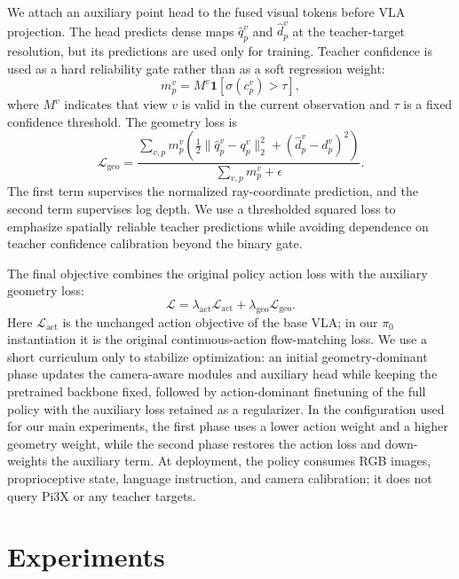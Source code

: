 \documentclass{article}
\begin{document}
We attach an auxiliary point head to the fused visual tokens before VLA projection. The head predicts dense maps $\hat{q}_p^v$ and $\hat{d}_p^v$ at the teacher-target resolution, but its predictions are used only for training. Teacher confidence is used as a hard reliability gate rather than as a soft regression weight:
\begin{equation}
    m_p^v = M^v\mathbf{1}\left[\sigma(c_p^v) > \tau\right],
\end{equation}
where $M^v$ indicates that view $v$ is valid in the current observation and $\tau$ is a fixed confidence threshold. The geometry loss is
\begin{equation}
    \mathcal{L}_{\mathrm{geo}} =
    \frac{
        \sum_{v,p} m_p^v
        \left(
            \frac{1}{2}\lVert \hat{q}_p^v - q_p^v \rVert_2^2
            +
            (\hat{d}_p^v - d_p^v)^2
        \right)
    }{
        \sum_{v,p} m_p^v + \epsilon
    } .
\end{equation}
The first term supervises the normalized ray-coordinate prediction, and the second term supervises log depth. We use a thresholded squared loss to emphasize spatially reliable teacher predictions while avoiding dependence on teacher confidence calibration beyond the binary gate.

The final objective combines the original policy action loss with the auxiliary geometry loss:
\begin{equation}
    \mathcal{L} = \lambda_{\mathrm{act}}\mathcal{L}_{\mathrm{act}}
    + \lambda_{\mathrm{geo}}\mathcal{L}_{\mathrm{geo}} .
\end{equation}
Here $\mathcal{L}_{\mathrm{act}}$ is the unchanged action objective of the base VLA; in our $\pi_0$ instantiation it is the original continuous-action flow-matching loss. We use a short curriculum only to stabilize optimization: an initial geometry-dominant phase updates the camera-aware modules and auxiliary head while keeping the pretrained backbone fixed, followed by action-dominant finetuning of the full policy with the auxiliary loss retained as a regularizer. In the configuration used for our main experiments, the first phase uses a lower action weight and a higher geometry weight, while the second phase restores the action loss and down-weights the auxiliary term. At deployment, the policy consumes RGB images, proprioceptive state, language instruction, and camera calibration; it does not query Pi3X or any teacher targets.

\section{Experiments}
\label{sec:results}
\end{document}
